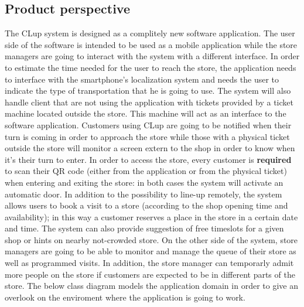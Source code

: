 \documentclass[]{article}
\begin{document}
		\subsection{Product perspective}
		The CLup system is designed as a complitely new software application. The user side of the software is intended to be used as a mobile application while the store managers are going to interact with the system with a different interface. \newline
		In order to estimate the time needed for the user to reach the store, the application needs to interface with the smartphone's localization system and needs the user to indicate the type of transportation that he is going to use. \newline
		The system will also handle client that are not using the application with tickets provided by a ticket machine located outside the store. This machine will act as an interface to the software application. \newline
		Customers using CLup are going to be notified when their turn is coming in order to approach the store while those with a physical ticket outside the store will monitor a screen extern to the shop in order to know when it's their turn to enter. \newline
		In order to access the store, every customer is \textbf{required} to scan their QR code (either from the application or from the physical ticket) when entering and exiting the store: in both cases the system will activate an automatic door. \newline
		In addition to the possibility to line-up remotely, the system allows users to book a visit to a store (according to the shop opening time and availability); in this way a customer reserves a place in the store in a certain date and time.\newline
		The system can also provide suggestion of free timeslots for a given shop or hints on nearby not-crowded store. \newline
		On the other side of the system, store managers are going to be able to monitor and manage the queue of their store as well as programmed visits. \newline
		In addition, the store manager can temporarly admit more people on the store if customers are expected to be in different parts of the store. \newline
		The below class diagram models the application domain in order to give an overlook on the enviroment where the application is going to work. \newline
		
\end{document}
